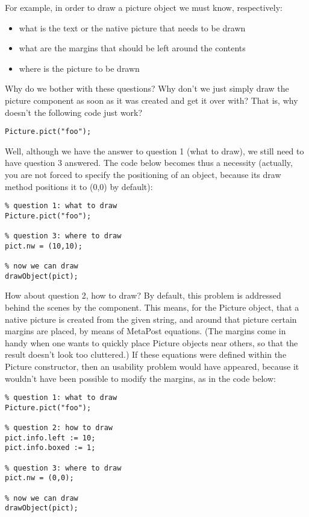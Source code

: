 \documentclass{article}
\newcommand{\code}{\ttfamily}
\begin{document}
For example, in order to draw a picture object we must know, respectively:
\begin{itemize}
\item what is the text or the native picture that needs to be drawn
\item what are the margins that should be left around the contents
\item where is the picture to be drawn
\end{itemize}

Why do we bother with these questions? Why don't we just simply draw the picture
component as soon as it was created and get it over with?
That is, why doesn't the following code just work?

\begin{verbatim}
Picture.pict("foo");
\end{verbatim}

Well, although we have the answer to question 1 (what to draw),
we still need to have question 3 answered. The code below becomes thus a
necessity (actually, you are not forced to specify the positioning of an object,
because its draw method positions it to {\code (0,0)} by default):

\begin{verbatim}
% question 1: what to draw
Picture.pict("foo");

% question 3: where to draw
pict.nw = (10,10);

% now we can draw
drawObject(pict);
\end{verbatim}

How about question 2, how to draw? By default, this problem is addressed behind the
scenes by the component. This means, for the Picture object, that a native picture is created
from the given string, and around that picture certain margins are placed, by means of MetaPost equations.
(The margins come in handy when one wants to quickly place Picture objects near others,
so that the result doesn't look too cluttered.)
If these equations were defined within the Picture constructor, then an
usability problem would have appeared, because it wouldn't have been possible to modify the margins,
as in the code below:

\begin{verbatim}
% question 1: what to draw
Picture.pict("foo");

% question 2: how to draw
pict.info.left := 10;
pict.info.boxed := 1;

% question 3: where to draw
pict.nw = (0,0);

% now we can draw
drawObject(pict);
\end{verbatim}
\end{document}
